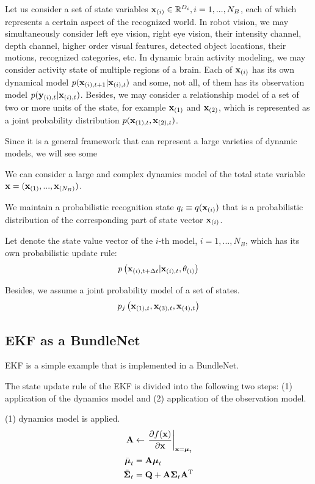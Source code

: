 \documentclass{article}
\begin{document}
Let us consider a set of state variables
${\bf x}_{(i)} \in \mathbb{R}^{D_i}, i=1,...,N_B$,
each of which represents a certain aspect of the recognized world.
In robot vision, we may simultaneously consider
left eye vision, right eye vision, their intensity channel, depth channel, higher order visual features,
detected object locations, their motions, recognized categories, etc.
In dynamic brain activity modeling, we may consider activity state of multiple regions of a brain.
Each of ${\bf x}_{(i)}$ has its own dynamical model $p({\bf x}_{(i), t+1} | {\bf x}_{(i),t} )$
and some, not all, of them has its observation model $p({\bf y}_{(i),t}|{\bf x}_{(i),t} )$.
Besides, we may consider a relationship model of a set of two or more units of the state,
for example ${\bf x}_{(1)}$ and ${\bf x}_{(2)}$,
which is represented as a joint probability distribution $p({\bf x}_{(1),t}, {\bf x}_{(2),t} )$.

Since it is a general framework that can represent a large varieties of dynamic models,
we will see some 

We can consider a large and complex dynamics model
 of the total state variable ${\bf x}=({\bf x}_{(1)}, ..., {\bf x}_{(N_B)})$.


We maintain a probabilistic recognition state $q_i \equiv q( {\bf x}_{(i)} )$ that is a probabilistic distribution of the corresponding part of state vector ${\bf x}_{(i)}$. 


Let  denote the state value vector of the $i$-th model,
$i=1,...,N_B$,
which has its own probabilistic update rule:
\begin{align*}
 p\left( {\bf x}_{(i), t+\Delta t} | {\bf x}_{(i),t}, \theta_{(i)} \right)
\end{align*}

Besides, we assume a joint probability model of a set of states.
\begin{align*}
 p_j\left( {\bf x}_{(1), t}, {\bf x}_{(3), t}, {\bf x}_{(4), t} \right)
\end{align*}



\subsection{EKF as a BundleNet}
EKF is a simple example that is implemented in a BundleNet.

The state update rule of the EKF is divided into the following two steps:
(1) application of the dynamics model and (2) application of the observation model.

(1) dynamics model is applied.
\begin{align*}
{\bf A} &\leftarrow \left. \frac{\partial f({\bf x})}{\partial {\bf x}} \right|_{{\bf x} = {\boldsymbol{\mu}}_t} \\
\bar{{\boldsymbol{\mu}}}_t &= {\bf A} {\boldsymbol{\mu}}_t \\
\bar{{\boldsymbol{\Sigma}}}_t &= {\bf Q} + {\bf A} {\boldsymbol{\Sigma}}_t {\bf A}{{}^{\rm T}}
\end{align*}
\end{document}
